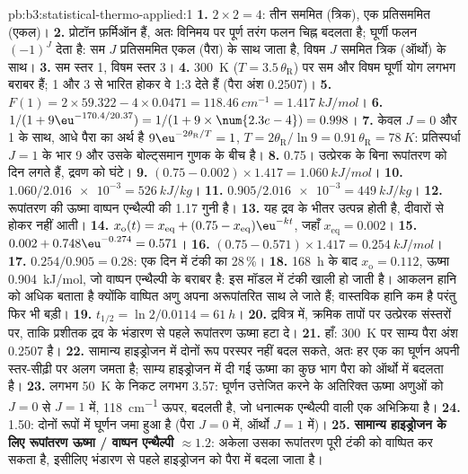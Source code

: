 \begin{solution}{pb:b3:statistical-thermo-applied:1}
\textbf{1.} $2 \times 2 = 4$: तीन सममित (त्रिक), एक प्रतिसममित (एकल)।
\textbf{2.} प्रोटॉन फ़र्मिऑन हैं, अतः विनिमय पर पूर्ण तरंग फलन चिह्न बदलता है;
घूर्णी फलन $(-1)^J$ देता है: सम $J$
प्रतिसममित एकल (पैरा) के साथ जाता है, विषम $J$ सममित त्रिक (ऑर्थो) के साथ।
\textbf{3.} सम स्तर 1, विषम स्तर 3।
\textbf{4.} \qty{300}{K} ($T = 3.5\,\theta_{\mathrm R}$) पर सम और विषम घूर्णी योग लगभग बराबर हैं;
1 और 3 से भारित होकर वे 1:3 देते हैं (पैरा अंश 0.2507)।
\textbf{5.} $F(1) = 2 \times 59.322 - 4 \times 0.0471 = \qty{118.46}{cm^{-1}} = \qty{1.417}{kJ/mol}$।
\textbf{6.} $1/(1 + 9\eu^{-170.4/20.37}) = 1/(1 + 9 \times \num{2.3e-4}) = 0.998$।
\textbf{7.} केवल $J = 0$ और 1 के साथ, आधे पैरा का अर्थ है $9\eu^{-2\theta_{\mathrm R}/T} = 1$, $T = 2\theta_{\mathrm R}/\ln9 =
0.91\,\theta_{\mathrm R} = \qty{78}{K}$: प्रतिस्पर्धा $J = 1$ के भार 9 और उसके
बोल्ट्समान गुणक के बीच है।
\textbf{8.} 0.75। उत्प्रेरक के बिना रूपांतरण को दिन लगते हैं, द्रवण को
घंटे।
\textbf{9.} $(0.75 - 0.002) \times 1.417 = \qty{1.060}{kJ/mol}$।
\textbf{10.} $1.060/\num{2.016e-3} = \qty{526}{kJ/kg}$।
\textbf{11.} $0.905/\num{2.016e-3} = \qty{449}{kJ/kg}$।
\textbf{12.} रूपांतरण की ऊष्मा वाष्पन एन्थैल्पी की 1.17 गुनी है।
\textbf{13.} यह द्रव के भीतर उत्पन्न होती है, दीवारों से होकर नहीं आती।
\textbf{14.} $x_{\mathrm o}(t) = x_{\mathrm{eq}} + (0.75 - x_{\mathrm{eq}})\eu^{-kt}$, जहाँ $x_{\mathrm{eq}} = 0.002$।
\textbf{15.} $0.002 + 0.748\eu^{-0.274} = 0.571$।
\textbf{16.} $(0.75 - 0.571) \times 1.417 = \qty{0.254}{kJ/mol}$।
\textbf{17.} $0.254/0.905 = 0.28$: एक दिन में टंकी का 28\,\%।
\textbf{18.} \qty{168}{h} के बाद $x_{\mathrm o} = 0.112$, ऊष्मा \qty{0.904}{kJ/mol}, जो वाष्पन
एन्थैल्पी के बराबर है: इस मॉडल में टंकी खाली हो जाती है। आकलन हानि को अधिक बताता है
क्योंकि वाष्पित अणु अपना अरूपांतरित  साथ ले
जाते हैं; वास्तविक हानि कम है परंतु फिर भी बड़ी।
\textbf{19.} $t_{1/2} = \ln2/0.0114 = \qty{61}{h}$।
\textbf{20.} द्रवित्र में, क्रमिक तापों पर उत्प्रेरक संस्तरों पर, ताकि
प्रशीतक द्रव के भंडारण से पहले रूपांतरण ऊष्मा हटा दे।
\textbf{21.} हाँ: \qty{300}{K} पर साम्य पैरा अंश 0.2507 है।
\textbf{22.} सामान्य हाइड्रोजन में दोनों रूप परस्पर नहीं बदल सकते, अतः हर एक का
घूर्णन अपनी स्तर-सीढ़ी पर अलग जमता है; साम्य हाइड्रोजन में
दी गई ऊष्मा का कुछ भाग पैरा को ऑर्थो में बदलता है।
\textbf{23.} लगभग \qty{50}{K} के निकट लगभग 3.57: घूर्णन उत्तेजित करने के अतिरिक्त ऊष्मा
अणुओं को $J = 0$ से $J = 1$ में, \qty{118}{cm^{-1}} ऊपर, बदलती है, जो धनात्मक
एन्थैल्पी वाली एक अभिक्रिया है।
\textbf{24.} 1.50: दोनों रूपों में घूर्णन जमा हुआ है (पैरा $J = 0$ में, ऑर्थो $J = 1$ में)।
\textbf{25.} \textbf{सामान्य हाइड्रोजन के लिए रूपांतरण ऊष्मा / वाष्पन एन्थैल्पी $\approx 1.2$}:
अकेला उसका रूपांतरण पूरी टंकी को वाष्पित कर सकता है, इसीलिए
भंडारण से पहले हाइड्रोजन को पैरा में बदला जाता है।
\end{solution}
